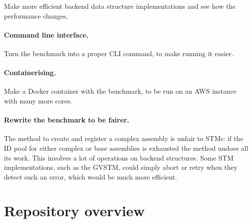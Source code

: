 \documentclass[12pt,a4paper,oneside,openright]{report}
\newcommand{\mycaption}[2]{\caption[#1]{#1 #2}}
\begin{document}
Make more efficient backend data structure implementations and see how
the performance changes.

\paragraph{Command line interface.}

Turn the benchmark into a proper CLI command, to make running it
easier.

\paragraph{Containerising.}
Make a Docker container with the benchmark, to be run on an AWS
instance with many more cores.

\paragraph{Rewrite the benchmark to be fairer.}
The method to create and register a complex assembly is unfair to
STMs: if the ID pool for either complex or base assemblies is
exhausted the method undoes all its work. This involves a lot of
operations on backend structures. Some STM implementations, such as
the GVSTM, could simply abort or retry when they detect such an error,
which would be much more efficient.

\section{Repository overview}
\label{sec:impl:repository-overview}


\end{document}

